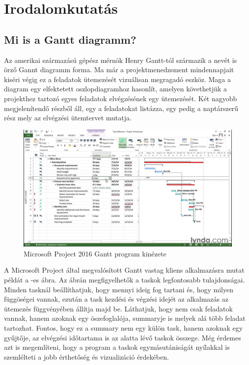 \chapter{Irodalomkutatás}\label{sect:Literature}
\section{Mi is a Gantt diagramm?}

\hspace{2mm} Az amerikai származású gépész mérnök Henry Gantt-tól származik a nevét is örző Gannt diagramm forma. Ma már a projektmenedzsment mindennapjait kiséri végig ez a feladatok ütemezését vizuálisan megragadó eszköz. Maga a diagram egy elfektetett oszlopdiagramhoz hasonlít, amelyen követhetjük a projekthez tartozó egyes feladatok elvégzésének egy ütemezését. \cite{GanttChart} Két nagyobb megjelenítendő részből áll, egy a feladatokat listázza, egy pedig a naptárszerű rész mely az elvégzési ütemtervet mutatja. 

\begin{figure}[!ht]
\centering
\includegraphics[width=\textwidth, keepaspectratio]{figures/msproject.jpg}
\caption{Microsoft Project 2016 Gantt program kinézete} 
\label{fig:MSProject}
\end{figure} 

A Microsoft Project által megvalósított Gantt vastag kliens alkalmazásra mutat példát a -es ábra. Az ábrán megfigyelhetők a taskok legfontosabb tulajdonságai. Minden tasknál beállíthatjuk, hogy mennyi ideig fog tartani és, hogy milyen függöségei vannak, ezután a task kezdési és végzési idejét az alkalmazás az ütemezés függvényében állítja majd be. Láthatjuk, hogy nem csak feladatok vannak, hanem azoknak egy öszefoglalója, summaryje is melyek alá több feladat tartozhat. Fontos, hogy ez a summary nem egy külön task, hanem azoknak egy gyűjtője, az elvégzési időtartama is az alatta lévő taskok összege. Még érdemes azt is megemlíteni, hogy a program a taskok egymásutániságát nyílakkal is szemlélteti a jobb érthetőség és vizualizáció érdekében. \cite{MsProject}

